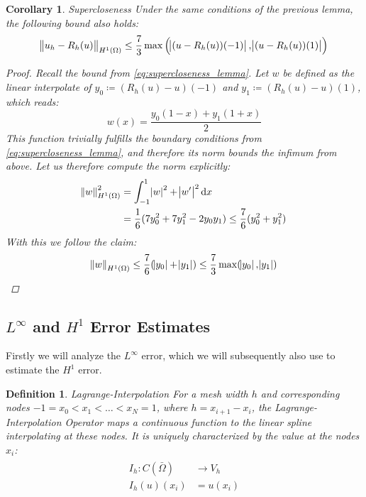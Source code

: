 \documentclass[headsepline,footsepline,footinclude=false,oneside,fontsize=11pt,paper=a4,listof=totoc,bibliography=totoc]{scrbook} %
\newtheorem{definition}{Definition}
\newtheorem{corollary}{Corollary}
\begin{document}
\begin{corollary} Supercloseness \newline
	Under the same conditions of the previous lemma, the following bound also holds:
	\begin{equation}\label{eq:supercloseness}
	\norm{u_h - R_h(u)}_{H^1(\Omega)} \leq \frac{7}{3} \max \left(\abs{(u-R_h(u))(-1)}, \abs{(u-R_h(u))(1)}\right)
	\end{equation}
	\begin{proof}
		Recall the bound from \eqref{eq:supercloseness_lemma}. Let $w$ be defined as the linear interpolate of $y_0 \coloneqq (R_h(u) - u)(-1)$ and $y_1 \coloneqq (R_h(u) - u)(1)$, which reads:
		\begin{equation}
		w(x) = \frac{y_0(1-x)+y_1(1+x)}{2}
		\end{equation}
		This function trivially fulfills the boundary conditions from \eqref{eq:supercloseness_lemma}, and therefore its norm bounds the infimum from above.
		Let us therefore compute the norm explicitly:
		\begin{align*}
		\norm{w}_{H^1(\Omega)}^2 &= \int_{-1}^1{\abs{w}^2 + \abs{w'}^2} \dif x\\
		&= \frac{1}{6}(7y_0^2 + 7 y_1^2 - 2y_0y_1)  \leq \frac{7}{6} (y_0^2 + y_1^2)
		\end{align*}
		With this we follow the claim:
		\begin{align*}
		\norm{w}_{H^1(\Omega)} \leq \frac{7}{6} (\abs{y_0} + \abs{y_1}) \leq \frac{7}{3} \max(\abs{y_0}, \abs{y_1})
		\end{align*}
	\end{proof}
\end{corollary}

\subsection{$L^{\infty}$ and $H^1$ Error Estimates}

Firstly we will analyze the $L^{\infty}$ error, which we will subsequently also use to estimate the $H^1$ error.

\begin{definition} Lagrange-Interpolation \newline
	For a mesh width $h$ and corresponding nodes $-1=x_0<x_1<\dots<x_N = 1$, where $h = x_{i+1} - x_i$, the Lagrange-Interpolation Operator maps a continuous function to the linear spline interpolating at these nodes. It is uniquely characterized by the value at the nodes $x_i$:
	\begin{align}
	\begin{split}
	I_h : C(\bar{\Omega}) &\rightarrow V_h \\
	I_h(u)(x_i) &= u(x_i)
	\end{split}
	\end{align}
\end{definition}
\end{document}

